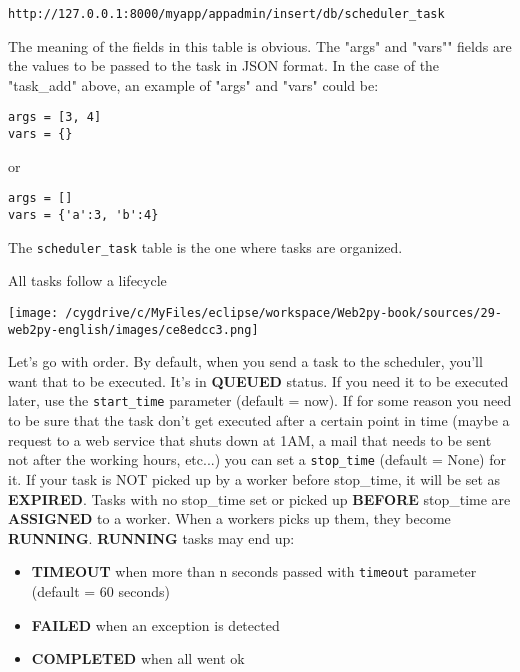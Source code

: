 \documentclass[justified,sixbynine,notoc]{tufte-book}
\def\ft{\small\tt}
\begin{document}
\begin{fullwidth}
\begin{lstlisting}[keywords={}]
http://127.0.0.1:8000/myapp/appadmin/insert/db/scheduler_task
\end{lstlisting}

The meaning of the fields in this table is obvious. The "args" and "vars"" fields are the values to be passed to the task in JSON format. In the case of the "task\_add" above, an example of "args" and "vars" could be:

\begin{lstlisting}
args = [3, 4]
vars = {}
\end{lstlisting}
\noindent or

\begin{lstlisting}
args = []
vars = {'a':3, 'b':4}
\end{lstlisting}

The {\ft scheduler\_task} table is the one where tasks are organized.

All tasks follow a lifecycle


\goodbreak\begin{center}\texttt{[image: /cygdrive/c/MyFiles/eclipse/workspace/Web2py-book/sources/29-web2py-english/images/ce8edcc3.png]}\end{center}


Let's go with order. By default, when you send a task to the scheduler, you'll want that to be executed. It's in {\bf QUEUED} status.
If you need it to be executed later, use the {\ft start\_time} parameter (default = now).
If for some reason you need to be sure that the task don't get executed after a certain point in time (maybe a request to a web service
that shuts down at 1AM, a mail that needs to be sent not after the working hours, etc...) you can set a {\ft stop\_time} (default = None) for it.
If your task is NOT picked up by a worker before stop\_time, it will be set as {\bf EXPIRED}.
Tasks with no stop\_time set or picked up {\bf BEFORE} stop\_time are {\bf ASSIGNED} to a worker. When a workers picks up them, they become {\bf RUNNING}.
{\bf RUNNING} tasks may end up:
\begin{itemize}
\item {\bf TIMEOUT} when more than n seconds passed with {\ft timeout} parameter (default = 60 seconds)

\item {\bf FAILED} when an exception is detected

\item {\bf COMPLETED} when all went ok
\end{itemize}


\end{fullwidth}
\end{document}
